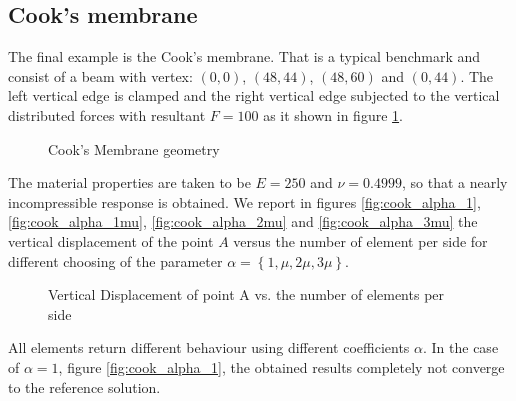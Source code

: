 \documentclass[a4paper,11pt]{article}
\begin{document}
\subsection{Cook's membrane}
The final example is the Cook's membrane. That is a typical benchmark and consist of a beam with vertex: $(0,0)$, $(48,44)$, $(48,60)$ and $(0,44)$.
The left vertical edge is clamped and the right vertical edge subjected to the vertical distributed forces with resultant $F=100$ as it shown in figure \ref{fig:cook}.
%
\begin{figure}[h!]
\begin{center}

\caption{Cook's Membrane geometry \label{fig:cook}}
\end{center}
\end{figure}
The material properties are taken to be $E = 250$ and $\nu = 0.4999$, so that a nearly incompressible response is obtained.
We report in figures \ref{fig:cook_alpha_1}, \ref{fig:cook_alpha_1mu}, \ref{fig:cook_alpha_2mu} and \ref{fig:cook_alpha_3mu} the vertical displacement of the point $A$ versus the number of element per side for different choosing of the parameter $\alpha=\left\lbrace 1, \mu, 2\mu, 3\mu \right\rbrace$.
\begin{figure}[h!]
\begin{center}
\subfigure[$\alpha=1$ \label{fig:cook_alpha_1}]
{}
\subfigure[$\alpha/ \mu=1$ \label{fig:cook_alpha_1mu}]
{}
\subfigure[$\alpha/ \mu=2$ \label{fig:cook_alpha_2mu}]
{}
\subfigure[$\alpha/ \mu=3$ \label{fig:cook_alpha_3mu}]
{}
\caption{Vertical Displacement of point A vs. 
the number of elements per side}
\end{center}
\end{figure}
All elements return different behaviour using different coefficients $\alpha$. In the case of $\alpha=1$, figure \ref{fig:cook_alpha_1}, the obtained results completely not converge to the reference solution.    
\end{document}
